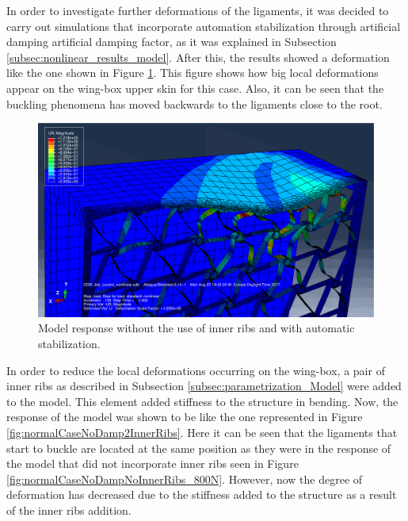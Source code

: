     In order to investigate further deformations of the ligaments, it was decided to carry out simulations that incorporate automation stabilization through artificial damping artificial damping factor, as it was explained in Subsection \ref{subsec:nonlinear_results_model}. After this, the results showed a deformation like the one shown in Figure \ref{fig:normalCaseDampNoInnerRibs}. This figure shows how big local deformations appear on the wing-box upper skin for this case. Also, it can be seen that the buckling phenomena has moved backwards to the ligaments close to the root.

    \begin{figure}[!htpb]
      \centering
      \includegraphics[width=0.8 \textwidth]{../figures/result-model/normalCaseDampNoInnerRibs}
      \caption[Model response without the use of inner ribs and with automatic stabilization]{Model response without the use of inner ribs and with automatic stabilization.}\label{fig:normalCaseDampNoInnerRibs}
    \end{figure}

    In order to reduce the local deformations occurring on the wing-box, a pair of inner ribs as described in Subsection \ref{subsec:parametrization_Model} were added to the model. This element added stiffness to the structure in bending. Now, the response of the model was shown to be like the one represented in Figure \ref{fig:normalCaseNoDamp2InnerRibs}. Here it can be seen that the ligaments that start to buckle are located at the same position as they were in the response of the model that did not incorporate inner ribs seen in Figure \ref{fig:normalCaseNoDampNoInnerRibs_800N}. However, now the degree of deformation has decreased due to the stiffness added to the structure as a result of the inner ribs addition.

